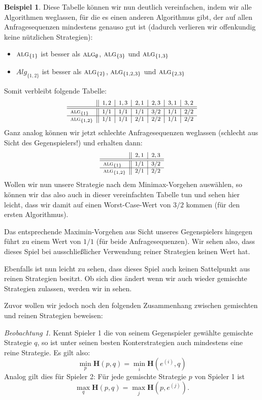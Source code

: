 \documentclass[a4paper,ngerman,12pt,bibtotoc]{scrartcl}
\theoremstyle{definition}
\newtheorem{bsp}[defn]{Beispiel}
\theoremstyle{plain}
\theoremstyle{remark}
\newtheorem{beob}[defn]{Beobachtung}
\renewcommand{\_}{\mathpunct{.}\,}
\newcommand{\?}{\,{:}\,}
\newcommand{\Alg}{\ensuremath{\textsc{alg}}}
\newcommand{\EH}{\boldsymbol{H}}
\begin{document}
\begin{bsp}
		Diese Tabelle können wir nun deutlich vereinfachen, indem wir alle Algorithmen weglassen, für die es einen anderen Algorithmus gibt, der auf allen Anfragesequenzen mindestens genauso gut ist (dadurch verlieren wir offenkundig keine nützlichen Strategien):
		\begin{itemize}
			\item $\Alg_{\{1\}}$ ist besser als $\Alg_\emptyset$, $\Alg_{\{3\}}$ und $\Alg_{\{1,3\}}$
			\item $Alg_{\{1,2\}}$ ist besser als $\Alg_{\{2\}}$, $\Alg_{\{1,2,3\}}$ und $\Alg_{\{2,3\}}$
		\end{itemize}
		Somit verbleibt folgende Tabelle:
		\[\footnotesize\begin{array}{l||c|c|c|c|c|c}
						& 1,2 & 1,3	& 2,1 & 2,3 & 3,1 & 3,2 \\\hline\hline
		\Alg_{\{1\}}	& 1/1 & 1/1 & 1/1 & 3/2 & 1/1 & 2/2 \\\hline
		\Alg_{\{1,2\}}	& 1/1 & 1/1 & 2/1 & 2/2 & 1/1 & 2/2
		\end{array}\]
		Ganz analog können wir jetzt \glqq schlechte\grqq{}  Anfragesequenzen weglassen (schlecht aus Sicht des Gegenspielers!) und erhalten dann:
		\[\footnotesize\begin{array}{l||c|c}
		& 2,1 & 2,3 \\\hline\hline
		\Alg_{\{1\}}	& 1/1 & 3/2 \\\hline
		\Alg_{\{1,2\}}	& 2/1 & 2/2
		\end{array}\]		
		Wollen wir nun unsere Strategie nach dem Minimax-Vorgehen auswählen, so können wir das also auch in dieser vereinfachten Tabelle tun und sehen hier leicht, dass wir damit auf einen Worst-Case-Wert von $3/2$ kommen (für den ersten Algorithmus).
		
		Das entsprechende Maximin-Vorgehen aus Sicht unseres Gegenspielers hingegen führt zu einem Wert von $1/1$ (für beide Anfragesequenzen). Wir sehen also, dass dieses Spiel bei ausschließlicher Verwendung reiner Strategien keinen Wert hat.
		
		Ebenfalls ist nun leicht zu sehen, dass dieses Spiel auch keinen Sattelpunkt aus reinen Strategien besitzt. Ob sich dies ändert wenn wir auch wieder gemischte Strategien zulassen, werden wir in  sehen.
	\end{bsp}
	
	Zuvor wollen wir jedoch noch den folgenden Zusammenhang zwischen gemischten und reinen Strategien beweisen:
	
	\begin{beob}\label{beob:reingleichgem}
		Kennt Spieler 1 die von seinem Gegenspieler gewählte gemischte Strategie $q$, so ist unter seinen besten Konterstrategien auch mindestens eine reine Strategie. Es gilt also:
		\begin{equation*}
		\min_p\EH(p,q) = \min_i \EH(e^{(i)},q)
		\end{equation*}	
		Analog gilt dies für Spieler 2: Für jede gemischte Strategie $p$ von Spieler 1 ist
		\begin{equation*}
		\max_q\EH(p,q) = \max_j \EH(p,e^{(j)}).
		\end{equation*}					
	\end{beob} 
	
\end{document}
